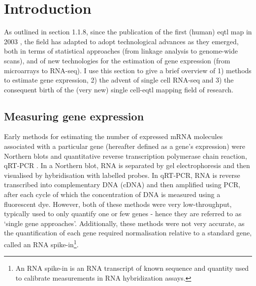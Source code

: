\newpage

\section{Introduction}

As outlined in section 
1.1.8,
since the publication of the first (human) \gls{eqtl} map in 2003 \cite{schadt2003genetics}, the field has adapted to adopt technological advances as they emerged, both in terms of statistical approaches (from linkage analysis to genome-wide scans), and of new technologies for the estimation of gene expression (from microarrays to RNA-seq).
I use this section to give a brief overview of 1) methods to estimate gene expression, 2) the advent of single cell RNA-seq and 3) the consequent birth of the (very new) single cell-\gls{eqtl} mapping field of research. 

\subsection{Measuring gene expression}

Early methods for estimating the number of expressed mRNA molecules associated with a particular gene (hereafter defined as a gene's expression)
were Northern blots \cite{alwine1977method} and quantitative reverse transcription polymerase chain reaction, qRT-PCR \cite{gibson1996novel}. 
In a Northern blot, RNA is separated by gel electrophoresis and then visualised by hybridisation with labelled probes. 
In qRT-PCR, RNA is reverse transcribed into complementary DNA (cDNA) and then amplified using PCR, after each cycle of which the concentration of DNA is measured using a fluorescent dye. 
However, both of these methods were very low-throughput, typically used to only quantify one or few genes - hence they are referred to as `single gene approaches'.
Additionally, these methods were not very accurate, as the quantification of each gene required normalisation relative to a standard gene, called an RNA spike-in\footnote{An RNA spike-in is an RNA transcript of known sequence and quantity used to calibrate measurements in RNA hybridization assays.}. 
\\

